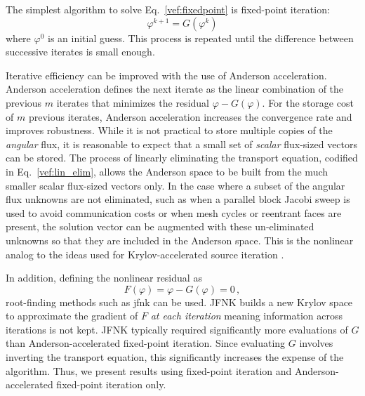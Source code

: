 \documentclass[../doc.tex]{subfiles}
\begin{document}
The simplest algorithm to solve Eq.~\ref{vef:fixedpoint} is fixed-point iteration: 
	\begin{equation}
		\varphi^{k+1} = G(\varphi^k) 
	\end{equation}
where $\varphi^0$ is an initial guess. This process is repeated until the difference between successive iterates is small enough. 

Iterative efficiency can be improved with the use of Anderson acceleration. Anderson acceleration defines the next iterate as the linear combination of the previous $m$ iterates that minimizes the residual $\varphi - G(\varphi)$. For the storage cost of $m$ previous iterates, Anderson acceleration increases the convergence rate and improves robustness. While it is not practical to store multiple copies of the \emph{angular} flux, it is reasonable to expect that a small set of \emph{scalar} flux-sized vectors can be stored. The process of linearly eliminating the transport equation, codified in Eq.~\ref{vef:lin_elim}, allows the Anderson space to be built from the much smaller scalar flux-sized vectors only. In the case where a subset of the angular flux unknowns are not eliminated, such as when a parallel block Jacobi sweep is used to avoid communication costs or when mesh cycles or reentrant faces are present, the solution vector can be augmented with these un-eliminated unknowns so that they are included in the Anderson space. This is the nonlinear analog to the ideas used for Krylov-accelerated source iteration \cite{doi:10.13182/NSE02-14}. 

In addition, defining the nonlinear residual as 
	\begin{equation}
		F(\varphi) = \varphi - G(\varphi) = 0 \,,
	\end{equation}
root-finding methods such as \gls{jfnk} can be used. JFNK builds a new Krylov space to approximate the gradient of $F$ \emph{at each iteration} meaning information across iterations is not kept. JFNK typically required significantly more evaluations of $G$ than Anderson-accelerated fixed-point iteration. Since evaluating $G$ involves inverting the transport equation, this significantly increases the expense of the algorithm. Thus, we present results using fixed-point iteration and Anderson-accelerated fixed-point iteration only. 
\end{document}
